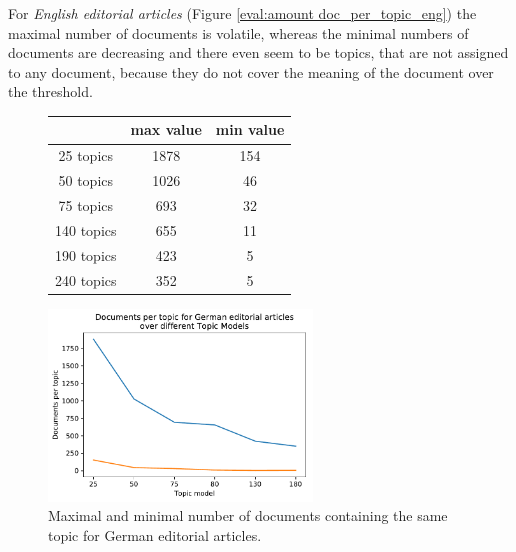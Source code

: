 For \textit{English editorial articles} (Figure \ref{eval:amount doc_per_topic_eng}) the maximal number of documents is volatile, whereas the minimal numbers of documents are decreasing and there even seem to be topics, that are not assigned to any document, because they do not cover the meaning of the document over the threshold. 

\begin{figure}[h]
	\begin{minipage}[t]{0.5\textwidth}
		\centering
		\begin{tabular}{c|cc}
			&max value & min value\\
			\hline
			25 topics&1878&154\\
			50 topics&1026&46\\
			75 topics&693&32\\
			140 topics&655&11\\
			190 topics &423&5\\
			240 topics&	352&5\\
		\end{tabular}
	\end{minipage}
	\begin{minipage}{0.5\textwidth}
		\centering
		\includegraphics[width=7cm]{gfx/Eval_IC/German_Editorial_Doc_per_topic.pdf}
	\end{minipage}
	\caption[]{Maximal and minimal number of documents containing the same topic for German editorial articles.}
	\label{eval:amount doc_per_topic_ger}
\end{figure}

